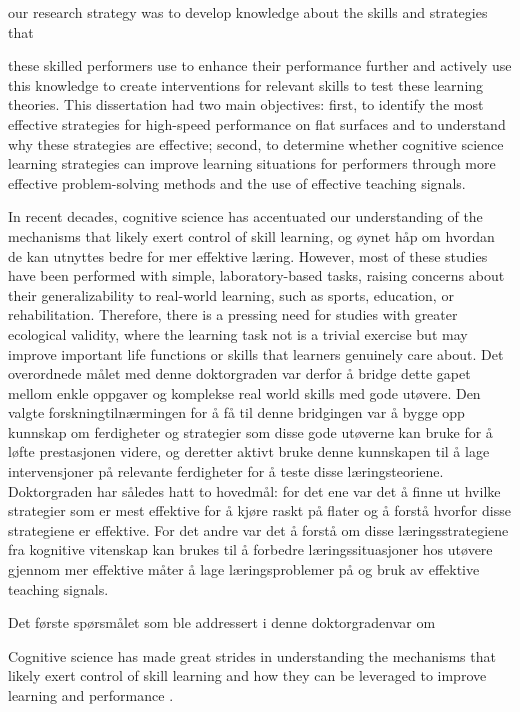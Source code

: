 our research strategy was to develop knowledge about the skills and strategies that 


these skilled performers use to enhance their performance further and actively use this knowledge to create interventions for relevant skills to test these learning theories. This dissertation had two main objectives: first, to identify the most effective strategies for high-speed performance on flat surfaces and to understand why these strategies are effective; second, to determine whether cognitive science learning strategies can improve learning situations for performers through more effective problem-solving methods and the use of effective teaching signals. 






In recent decades, cognitive science has accentuated our understanding of the mechanisms that likely exert control of skill learning, og øynet håp om hvordan de kan utnyttes bedre for mer effektive læring. However, most of these studies have been performed with simple, laboratory-based tasks, raising concerns about their generalizability to real-world learning, such as sports, education, or rehabilitation. Therefore, there is a pressing need for studies with greater ecological validity, where the learning task not is a trivial exercise but may improve important life functions or skills that learners genuinely care about. Det overordnede målet med denne doktorgraden var derfor å bridge dette gapet mellom enkle oppgaver og komplekse real world skills med gode utøvere. Den valgte forskningtilnærmingen for å få til denne bridgingen var å bygge opp kunnskap om ferdigheter og strategier som disse gode utøverne kan bruke for å løfte prestasjonen videre, og deretter aktivt bruke denne kunnskapen til å lage intervensjoner på relevante ferdigheter for å teste disse læringsteoriene. Doktorgraden har således hatt to hovedmål: for det ene var det å finne ut hvilke strategier som er mest effektive for å kjøre raskt på flater og å forstå hvorfor disse strategiene er effektive. For det andre var det å forstå om disse læringsstrategiene fra kognitive vitenskap kan brukes til å forbedre læringssituasjoner hos utøvere gjennom mer effektive måter å lage læringsproblemer på og bruk av effektive teaching signals.

Det første spørsmålet som ble addressert i denne doktorgradenvar om 



Cognitive science has made great strides in understanding the mechanisms that likely exert control of skill learning and how they can be leveraged to improve learning and performance \cite{wolpert_principles_2011, makino_circuit_2016, spampinato_multiple_2021, krakauer_motor_2019, haith_model-based_2013, huang_rethinking_2011, shmuelof_are_2011, doya_complementary_2000}. 






